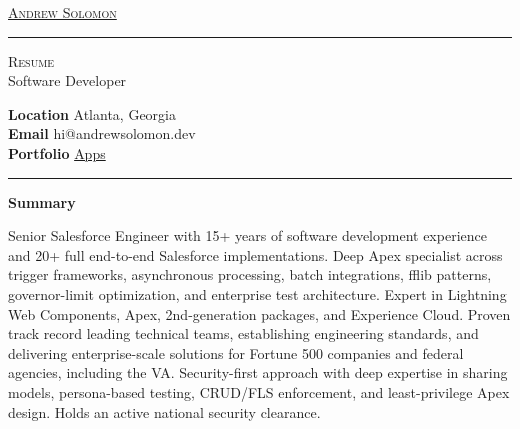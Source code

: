 \documentclass[10pt]{article}
\newcommand{\cvsection}[1]
{
	\begin{center}
		\large\textcolor{sectcol}{\textbf{#1}}
	\end{center}
}
\newcommand{\metasection}[2]
{
\footnotesize{#2} \hspace*{\fill} \footnotesize{#1}\\[1pt]
}
\begin{document}
\pagestyle{fancy}

\color{textcol}








\vspace{-8pt}
\begin{center}
	\HUGE \textsc{\href{https://www.linkedin.com/in/andrew-solomon-44550a24/}{Andrew Solomon}} \textcolor{sectcol}{\rule[-1mm]{1mm}{0.9cm}} \textsc{Resume}\\[2pt]
	\small Software Developer
\end{center}



\vspace{6pt}


\metasection{Atlanta, Georgia}{\textbf{Location}}
\metasection{hi@andrewsolomon.dev}{\textbf{Email}}
\metasection{\href{https://andrewsolomon.dev/projects/}{Apps}}{\textbf{Portfolio}}
\vspace{-2pt}
\textcolor{softcol}{\hrule}
\vspace{6pt}

\normalsize

\cvsection{Summary}
Senior Salesforce Engineer with 15+ years of software development experience and 20+ full end-to-end Salesforce implementations. Deep Apex specialist across trigger frameworks, asynchronous processing, batch integrations, fflib patterns, governor-limit optimization, and enterprise test architecture. Expert in Lightning Web Components, Apex, 2nd-generation packages, and Experience Cloud. Proven track record leading technical teams, establishing engineering standards, and delivering enterprise-scale solutions for Fortune 500 companies and federal agencies, including the VA. Security-first approach with deep expertise in sharing models, persona-based testing, CRUD/FLS enforcement, and least-privilege Apex design. Holds an active national security clearance.
\end{document}
